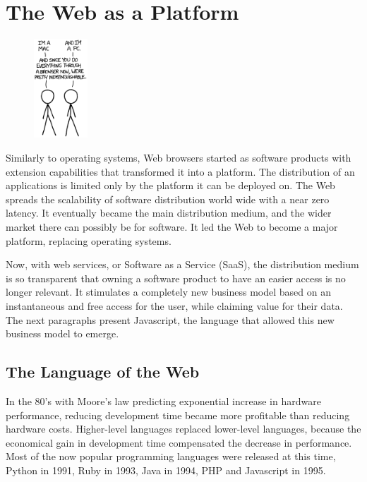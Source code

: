 \section{The Web as a Platform} \label{chapter2:web-as-a-platform}

\begin{figure}
  \vspace{-27pt}
  \begin{center}
    \includegraphics[width=0.18\textwidth]{../ressources/Mac-PC.png}
  \end{center}
  \vspace{-20pt}
\end{figure}

Similarly to operating systems, Web browsers started as software products with extension capabilities that transformed it into a platform. %
The distribution of an applications is limited only by the platform it can be deployed on.
The Web spreads the scalability of software distribution world wide with a near zero latency.
It eventually became the main distribution medium, and the wider market there can possibly be for software.
It led the Web to become a major platform, replacing operating systems.

Now, with web services, or Software as a Service (SaaS), the distribution medium is so transparent that owning a software product to have an easier access is no longer relevant.
It stimulates a completely new business model based on an instantaneous and free access for the user, while claiming value for their data.
The next paragraphs present Javascript, the language that allowed this new business model to emerge.

\subsection{The Language of the Web}

In the 80's with Moore's law predicting exponential increase in hardware performance, reducing development time became more profitable than reducing hardware costs.
Higher-level languages replaced lower-level languages, because the economical gain in development time compensated the decrease in performance.
Most of the now popular programming languages were released at this time, Python in 1991, Ruby in 1993, Java in 1994, PHP and Javascript in 1995.


